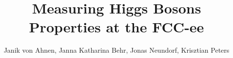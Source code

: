 \documentclass[a4paper,11pt]{article}
\title{Measuring Higgs Bosons Properties at the FCC-ee}
\author{Janik von Ahnen, Janna Katharina Behr, Jonas Neundorf, Krisztian Peters}
\affiliation{Deutsches Elektronen-Synchrotron (DESY), Hamburg }
\begin{document}
 
\maketitle

\flushbottom






\end{document}
